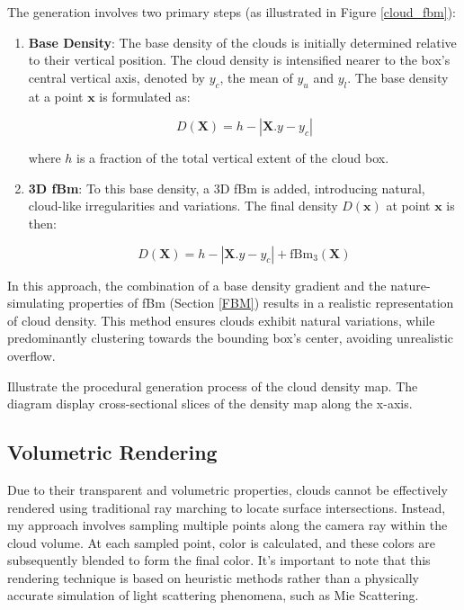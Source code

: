 The generation involves two primary steps (as illustrated in Figure \ref{cloud_fbm}):
\begin{enumerate}
    \item \textbf{Base Density}: The base density of the clouds is initially determined relative to their vertical position. The cloud density is intensified nearer to the box's central vertical axis, denoted by $y_c$, the mean of $y_u$ and $y_l$. The base density at a point $\mathbf{x}$ is formulated as:

\begin{equation}
    D(\mathbf{X}) = h - |\mathbf{X}.y - y_{c}|
\end{equation}

    where $h$ is a fraction of the total vertical extent of the cloud box.

    \item \textbf{3D fBm}: To this base density, a 3D fBm is added, introducing natural, cloud-like irregularities and variations. The final density $D(\mathbf{x})$ at point $\mathbf{x}$ is then:

\begin{equation}
    D(\mathbf{X}) = h - |\mathbf{X}.y - y_{c}| + \text{fBm}_3(\mathbf{X})
\end{equation}
\end{enumerate}

In this approach, the combination of a base density gradient and the nature-simulating properties of fBm (Section \ref{FBM}) results in a realistic representation of cloud density. This method ensures clouds exhibit natural variations, while predominantly clustering towards the bounding box's center, avoiding unrealistic overflow.

{Illustrate the procedural generation process of the cloud density map. The diagram display cross-sectional slices of the density map along the x-axis.}

\subsection{Volumetric Rendering}

Due to their transparent and volumetric properties, clouds cannot be effectively rendered using traditional ray marching to locate surface intersections. Instead, my approach involves sampling multiple points along the camera ray within the cloud volume. At each sampled point, color is calculated, and these colors are subsequently blended to form the final color. It’s important to note that this rendering technique is based on heuristic methods rather than a physically accurate simulation of light scattering phenomena, such as Mie Scattering.

